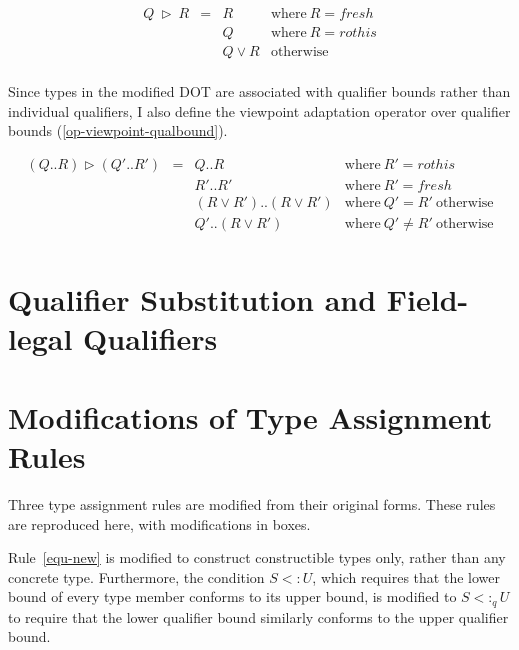 \begin{equation*}\tag{$\triangleright$-QUAL}\label{op-viewpoint-qual}
\begin{array}{llll}
Q\ \triangleright\ R &=& R & \text{where}\ R = fresh \\
   & & Q & \text{where}\ R = rothis \\
	 & & Q \lor R & \text{otherwise} \\
\end{array}
\end{equation*}

Since types in the modified DOT are associated with qualifier bounds
rather than individual qualifiers, I also define the viewpoint adaptation
operator over qualifier bounds (\mbox{\ref{op-viewpoint-qualbound}}).

\begin{equation*}\tag{$\triangleright$-QUALBOUND}\label{op-viewpoint-qualbound}
\begin{array}{llll}
(Q..R) \triangleright (Q'..R')
   &=& Q..R & \text{where}\ R'=rothis \\
   & & R'..R' & \text{where}\ R'=fresh \\
   & & (R \lor R') .. (R \lor R') & \text{where}\ Q'=R'\ \text{otherwise} \\
   & & Q' .. (R \lor R') & \text{where}\ Q' \neq R'\ \text{otherwise} \\
\end{array}
\end{equation*}

\section{Qualifier Substitution and Field-legal Qualifiers} \label{sec-aux-dot}



\section{Modifications of Type Assignment Rules} \label{sec-type-assign}

Three type assignment rules are modified from their original forms.
These rules are reproduced here, with modifications in boxes.

Rule~\ref{equ-new} is modified to construct constructible types only,
rather than any concrete type.
Furthermore, the condition \mbox{$S<:U$}, which requires that
the lower bound of every type member conforms to its upper bound,
is modified to \mbox{$S <:_q U$} to require that the lower qualifier bound similarly conforms
to the upper qualifier bound.

